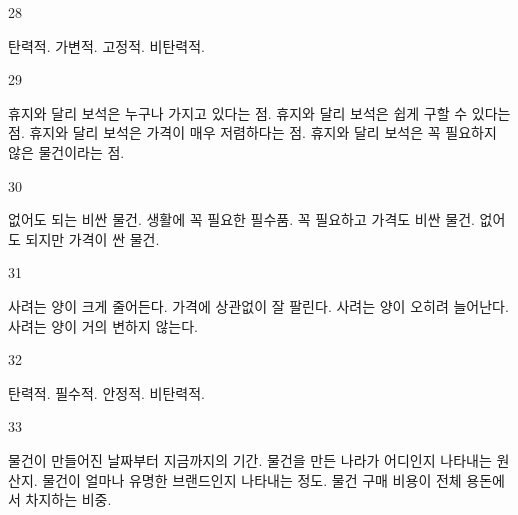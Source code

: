 \documentclass[fs9,seriesFre]{korfarm-base}
\begin{document}
\begin{kfSentenceUnit}{28}{}
\begin{kfChoices}
\kfChoice 탄력적.
\kfChoice 가변적.
\kfChoice 고정적.
\kfChoice 비탄력적.
\end{kfChoices}
\end{kfSentenceUnit}

\begin{kfSentenceUnit}{29}{}
\begin{kfChoices}
\kfChoice 휴지와 달리 보석은 누구나 가지고 있다는 점.
\kfChoice 휴지와 달리 보석은 쉽게 구할 수 있다는 점.
\kfChoice 휴지와 달리 보석은 가격이 매우 저렴하다는 점.
\kfChoice 휴지와 달리 보석은 꼭 필요하지 않은 물건이라는 점.
\end{kfChoices}
\end{kfSentenceUnit}

\begin{kfSentenceUnit}{30}{}
\begin{kfChoices}
\kfChoice 없어도 되는 비싼 물건.
\kfChoice 생활에 꼭 필요한 필수품.
\kfChoice 꼭 필요하고 가격도 비싼 물건.
\kfChoice 없어도 되지만 가격이 싼 물건.
\end{kfChoices}
\end{kfSentenceUnit}

\begin{kfSentenceUnit}{31}{}
\begin{kfChoices}
\kfChoice 사려는 양이 크게 줄어든다.
\kfChoice 가격에 상관없이 잘 팔린다.
\kfChoice 사려는 양이 오히려 늘어난다.
\kfChoice 사려는 양이 거의 변하지 않는다.
\end{kfChoices}
\end{kfSentenceUnit}

\begin{kfSentenceUnit}{32}{}
\begin{kfChoices}
\kfChoice 탄력적.
\kfChoice 필수적.
\kfChoice 안정적.
\kfChoice 비탄력적.
\end{kfChoices}
\end{kfSentenceUnit}

\begin{kfSentenceUnit}{33}{}
\begin{kfChoices}
\kfChoice 물건이 만들어진 날짜부터 지금까지의 기간.
\kfChoice 물건을 만든 나라가 어디인지 나타내는 원산지.
\kfChoice 물건이 얼마나 유명한 브랜드인지 나타내는 정도.
\kfChoice 물건 구매 비용이 전체 용돈에서 차지하는 비중.
\end{kfChoices}
\end{kfSentenceUnit}
\end{document}
